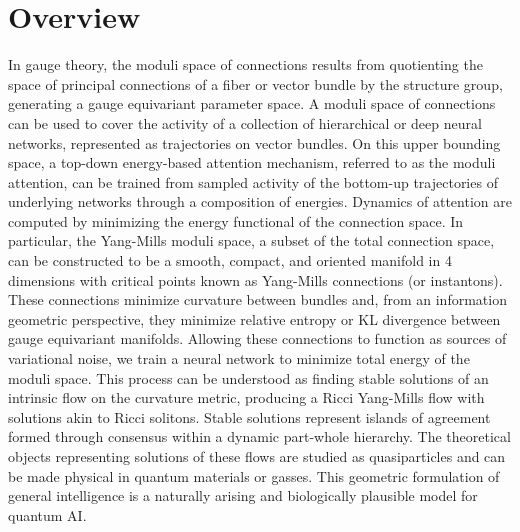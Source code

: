 \documentclass{article}
\begin{document}
\section{Overview}
In gauge theory, the moduli space of connections results from quotienting the space of principal connections of a fiber or vector bundle by the structure group, generating a gauge equivariant parameter space. A moduli space of connections can be used to cover the activity of a collection of hierarchical or deep neural networks, represented as trajectories on vector bundles. On this upper bounding space, a top-down energy-based attention mechanism, referred to as the moduli attention, can be trained from sampled activity of the bottom-up trajectories of underlying networks through a composition of energies. Dynamics of attention are computed by minimizing the energy functional of the connection space. In particular, the Yang-Mills moduli space, a subset of the total connection space, can be constructed to be a smooth, compact, and oriented manifold in 4 dimensions with critical points known as Yang-Mills connections (or instantons). These connections minimize curvature between bundles and, from an information geometric perspective, they minimize relative entropy or KL divergence between gauge equivariant manifolds. Allowing these connections to function as sources of variational noise, we train a neural network to minimize total energy of the moduli space. This process can be understood as finding stable solutions of an intrinsic flow on the curvature metric, producing a Ricci Yang-Mills flow with solutions akin to Ricci solitons. Stable solutions represent islands of agreement formed through consensus within a dynamic part-whole hierarchy. The theoretical objects representing solutions of these flows are studied as quasiparticles and can be made physical in quantum materials or gasses. This geometric formulation of general intelligence is a naturally arising and biologically plausible model for quantum AI. 

\end{document}
